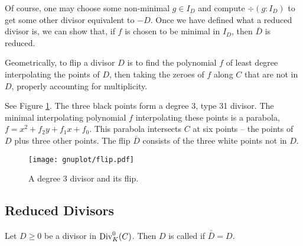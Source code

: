 Of course, one may choose some non-minimal $g \in I_D$ and compute $\div(g : I_D)$ to get some other
divisor equivalent to $-D$.
Once we have defined what a reduced divisor is, we can show that, if $f$ is chosen to be minimal in $I_D$,
then $\bar D$ is reduced.

Geometrically, to flip a divisor $D$ is to find the polynomial $f$ of least degree interpolating the points of $D$,
then taking the zeroes of $f$ along $C$ that are not in $D$, properly accounting for multiplicity.
\begin{example}
  See Figure \ref{fig_divisor_flip}.
  The three black points form a degree 3, type 31 divisor. 
  The minimal interpolating polynomial $f$ interpolating these points is a parabola,
  $f = x^2 + f_2y + f_1x + f_0$.
  This parabola intersects $C$ at six points -- the points of $D$ plus three other points.
  The flip $\bar D$ consists of the three white points not in $D$.
\end{example}

\begin{figure}[ht!]
  \caption{A degree 3 divisor and its flip. }
  \label{fig_divisor_flip}
  \begin{center}
    \texttt{[image: gnuplot/flip.pdf]}
  \end{center}
\end{figure}


\subsection{Reduced Divisors}

\begin{definition}
  \label{def_reduced_divisor}
  Let $D \geq 0$ be a divisor in $\operatorname{Div}_K^0(C)$.
  Then $D$ is called  if $\bar{\bar D} = D$.
\end{definition}


